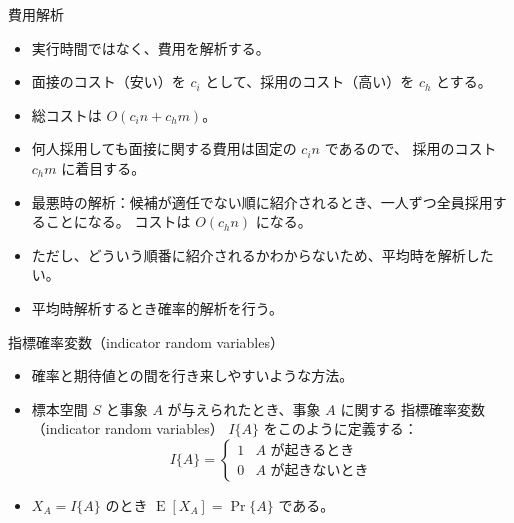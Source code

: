 \documentclass[unicode,11pt,aspectratio=169,notes]{beamer} %
\DeclareMathOperator{\E}{\mathrm{E}}
\begin{document}
\begin{frame}{費用解析}
  \begin{itemize}
    \item<+-> 実行時間ではなく、費用を解析する。
    \item<+-> 面接のコスト（安い）を $c_i$ として、採用のコスト（高い）を $c_h$ とする。
    \item<+-> 総コストは $O(c_in+c_hm)$。
    \item<+-> 何人採用しても面接に関する費用は固定の $c_in$ であるので、
    採用のコスト $c_hm$ に着目する。
    \item<+-> 最悪時の解析：候補が適任でない順に紹介されるとき、一人ずつ全員採用することになる。
    コストは $O(c_hn)$ になる。
    \item<+-> ただし、どういう順番に紹介されるかわからないため、平均時を解析したい。
    \item<+-> 平均時解析するとき確率的解析を行う。
  \end{itemize}
\end{frame}

\begin{frame}{指標確率変数（indicator random variables）}
  \begin{itemize}
    \item<+-> 確率と期待値との間を行き来しやすいような方法。
    \item<+-> 標本空間 $S$ と事象 $A$ が与えられたとき、事象 $A$ に関する
    指標確率変数（indicator random variables） $I\{A\}$ をこのように定義する：
    \[
      I\{A\} =
      \begin{cases}
        1 & A \text{ が起きるとき} \\
        0 & A \text{ が起きないとき}
      \end{cases}
    \]
    \item<+-> $X_A = I\{A\}$ のとき $\E[X_A]=\Pr\{A\}$ である。
  \end{itemize}
\end{frame}
\end{document}
